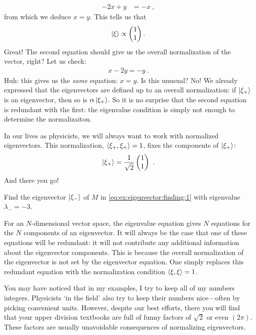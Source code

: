 \documentclass[12pt]{article}
\begin{document}
\begin{example}
\begin{align}
    -2x + y &= -x  \ ,
\end{align}
from which we deduce $x=y$. This tells us that
\begin{align}
    \left|\xi\right\rangle \propto \begin{pmatrix}
        1\\ 1
    \end{pmatrix} .
\end{align}
Great! The second equation should give us the overall normalization of the vector, right? Let us check:
\begin{align}
    x - 2y = -y \ .
\end{align}
Huh: this gives us the \emph{same} equation: $x=y$. Is this unusual? No! We already expressed that the eigenvectors are defined up to an overall normalization: if $\left|\xi_+\right\rangle$ is an eigenvector, then so is $\alpha\left|\xi_+\right\rangle$. So it is no surprise that the second equation is redundant with the first: the eigenvalue condition is simply not enough to determine the normalizaiton. 

In our lives as physicists, we will always want to work with normalized eigenvectors. This normalization, $\langle\xi_+,\xi_+\rangle = 1$, fixes the components of $\left|\xi_+\right\rangle$:
\begin{align}
    \left|\xi_+\right\rangle = 
    \frac{1}{\sqrt{2}}
    \begin{pmatrix}
        1 \\ 1
    \end{pmatrix} \ .
\end{align}
And there you go!
\end{example}


\begin{exercise}
Find the eigenvector $\left|\xi_-\right\rangle$ of $M$ in \eqref{eq:ex:eigenvector:finding:1} with eigenvalue $\lambda_- = -3$. 
\end{exercise}

For an $N$-dimensional vector space, the eigenvalue equation gives $N$ equations for the $N$ components of an eigenvector. It will always be the case that one of these equations will be redundant: it will not contribute any additional information about the eigenvector components. This is because the overall normalization of the eigenvector is not set by the eigenvector equation. One simply replaces this redundant equation with the normalization condition $\langle \xi,\xi\rangle = 1$. 

You may have noticed that in my examples, I try to keep all of my numbers integers. Physicists `in the field' also try to keep their numbers nice---often by picking convenient units. However, despite our best efforts, there you will find that your upper division textbooks are full of funny factors of $\sqrt{2}$ or even $(2\pi)$. These factors are usually unavoidable consequences of normalizing eigenvectors. 
\end{document}
